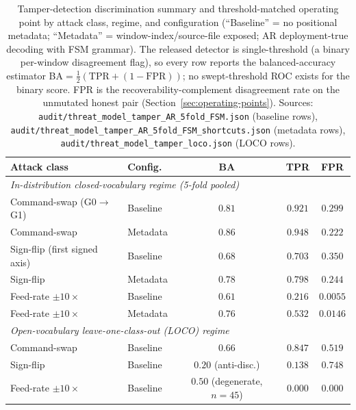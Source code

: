 \documentclass[sensors,article,submit,moreauthors,pdftex]{Definitions/mdpi}
\begin{document}
\begin{table}[!htbp]
\centering
\caption{Tamper-detection discrimination summary and threshold-matched operating point by attack class, regime, and configuration (``Baseline'' = no positional metadata; ``Metadata'' = window-index/source-file exposed; AR deployment-true decoding with FSM grammar). The released detector is single-threshold (a binary per-window disagreement flag), so every row reports the balanced-accuracy estimator BA$=\!\tfrac{1}{2}(\mathrm{TPR}+(1-\mathrm{FPR}))$; no swept-threshold ROC exists for the binary score. FPR is the recoverability-complement disagreement rate on the unmutated honest pair (Section~\ref{sec:operating-points}). Sources: \texttt{audit/threat\_model\_tamper\_AR\_5fold\_FSM.json} (baseline rows), \texttt{audit/threat\_model\_tamper\_AR\_5fold\_FSM\_shortcuts.json} (metadata rows), \texttt{audit/threat\_model\_tamper\_loco.json} (LOCO rows).}
\label{tab:tamper_auc}
\footnotesize
\setlength{\tabcolsep}{4pt}
\begin{tabular}{l l c c c}
\toprule
\textbf{Attack class} & \textbf{Config.} & \textbf{BA} & \textbf{TPR} & \textbf{FPR} \\
\midrule
\multicolumn{5}{l}{\emph{In-distribution closed-vocabulary regime (5-fold pooled)}} \\
Command-swap (G0$\to$G1)    & Baseline & $0.81$ & $0.921$ & $0.299$ \\
Command-swap                & Metadata  & $0.86$ & $0.948$ & $0.222$ \\
Sign-flip (first signed axis) & Baseline & $0.68$ & $0.703$ & $0.350$ \\
Sign-flip                   & Metadata  & $0.78$ & $0.798$ & $0.244$ \\
Feed-rate $\pm 10\times$    & Baseline & $0.61$ & $0.216$ & $0.0055$ \\
Feed-rate $\pm 10\times$    & Metadata  & $0.76$ & $0.532$ & $0.0146$ \\
\midrule
\multicolumn{5}{l}{\emph{Open-vocabulary leave-one-class-out (LOCO) regime}} \\
Command-swap                & Baseline & $0.66$ & $0.847$ & $0.519$ \\
Sign-flip                   & Baseline & $0.20$ \tiny{(anti-disc.)} & $0.138$ & $0.748$ \\
Feed-rate $\pm 10\times$    & Baseline & $0.50$ \tiny{(degenerate, $n\!=\!45$)} & $0.000$ & $0.000$ \\
\bottomrule
\end{tabular}
\end{table}
\end{document}
